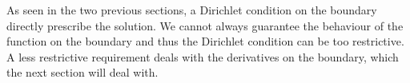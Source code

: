 As seen in the two previous sections, a Dirichlet condition on the boundary 
directly prescribe the solution. We cannot always guarantee  
the behaviour of the function on the boundary and thus the Dirichlet condition 
can be too restrictive.
A less restrictive requirement deals with the derivatives on the boundary, 
which the next section will deal with.